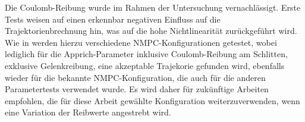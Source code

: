 Die Coulomb-Reibung wurde im Rahmen der Untersuchung vernachlässigt. Erste Tests weisen auf einen erkennbar negativen Einfluss auf die Trajektorienbrechnung hin, was auf die hohe Nichtlinearität zurückgeführt wird. Wie in  werden hierzu verschiedene NMPC-Konfigurationen getestet, wobei lediglich für die Apprich-Parameter inklusive Coulomb-Reibung am Schlitten, exklusive Gelenkreibung, eine akzeptable Trajekorie gefunden wird, ebenfalls wieder für die bekannte NMPC-Konfiguration, die auch für die anderen Parametertests verwendet wurde. Es wird daher für zukünftige Arbeiten empfohlen, die für diese Arbeit gewählte Konfiguration weiterzuverwenden, wenn eine Variation der Reibwerte angestrebt wird.  
